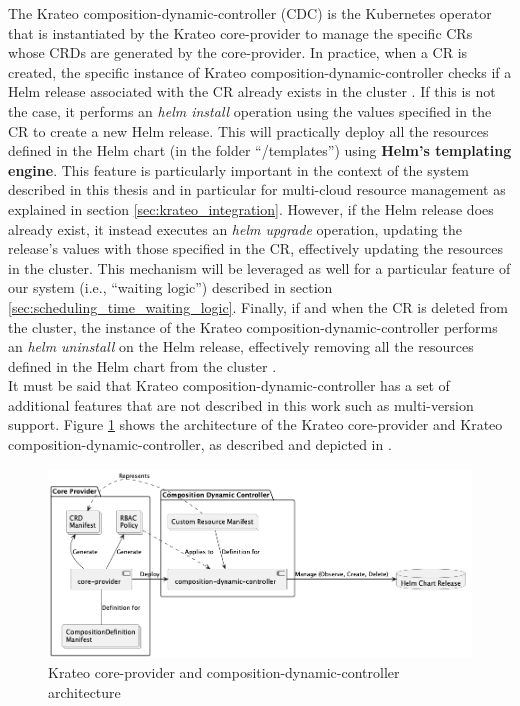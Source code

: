 The Krateo composition-dynamic-controller (CDC) is the Kubernetes operator that is instantiated by the Krateo core-provider to manage the specific CRs whose CRDs are generated by the core-provider.
In practice, when a CR is created, the specific instance of Krateo composition-dynamic-controller checks if a Helm release associated with the CR already exists in the cluster \cite{krateo_composition_dynamic_controller}. 
If this is not the case, it performs an \textit{helm install} operation using the values specified in the CR to create a new Helm release. 
This will practically deploy all the resources defined in the Helm chart (in the folder ``/templates'') using \textbf{Helm's templating engine}.
This feature is particularly important in the context of the system described in this thesis and in particular for multi-cloud resource management as explained in section \ref{sec:krateo_integration}.
However, if the Helm release does already exist, it instead executes an \textit{helm upgrade} operation, updating the release's values with those specified in the CR, effectively updating the resources in the cluster.
This mechanism will be leveraged as well for a particular feature  of our system (i.e., ``waiting logic'') described in section \ref{sec:scheduling_time_waiting_logic}.
Finally, if and when the CR is deleted from the cluster, the instance of the Krateo composition-dynamic-controller performs an \textit{helm uninstall} on the Helm release, effectively removing all the resources defined in the Helm chart from the cluster \cite{krateo_composition_dynamic_controller}. \\

It must be said that Krateo composition-dynamic-controller has a set of additional features that are not described in this work such as multi-version support.
Figure \ref{fig:krateo_core_provider} shows the architecture of the Krateo core-provider and Krateo composition-dynamic-controller, as described and depicted in \cite{krateo_core_provider}.

\begin{figure}[t]
    \centering
    \includegraphics[width=1\linewidth]{images/kraeto_core_provider.png}
    \caption{Krateo core-provider and composition-dynamic-controller architecture \cite{krateo_core_provider}}
    \label{fig:krateo_core_provider}
\end{figure}

